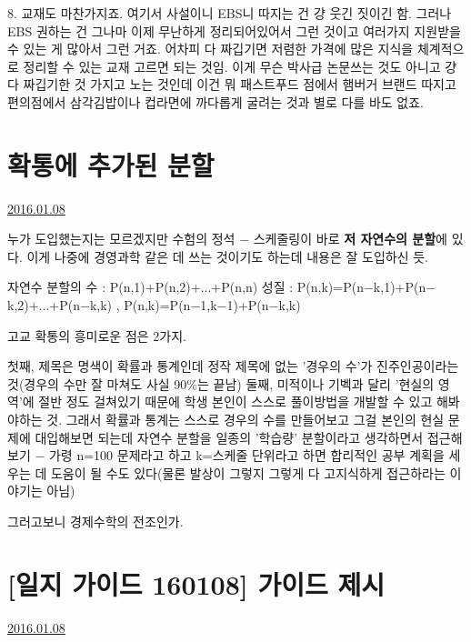 8. 교재도 마찬가지죠. 여기서 사설이니 EBS니 따지는 건 걍 웃긴 짓이긴 함.
그러나 EBS 권하는 건 그나마 이제 무난하게 정리되어있어서 그런 것이고 여러가지 지원받을 수 있는 게 많아서 그런 거죠.
어차피 다 짜깁기면 저렴한 가격에 많은 지식을 체계적으로 정리할 수 있는 교재 고르면 되는 것임.
이게 무슨 박사급 논문쓰는 것도 아니고 걍 다 짜깁기한 것 가지고 노는 것인데
이건 뭐 패스트푸드 점에서 햄버거 브랜드 따지고 편의점에서 삼각김밥이나 컵라면에 까다롭게 굴려는 것과 별로 다를 바도 없죠.






\section{확통에 추가된 분할}
\href{https://www.kockoc.com/Apoc/580053}{2016.01.08}

\vspace{5mm}

누가 도입했는지는 모르겠지만
수험의 정석 $-$ 스케줄링이 바로 \textbf{저 자연수의 분할}에 있다.
이게 나중에 경영과학 같은 데 쓰는 것이기도 하는데 내용은 잘 도입하신 듯.
\vspace{5mm}

자연수 분할의 수 : P(n,1)+P(n,2)+...+P(n,n)
성질 : P(n,k)=P(n$-$k,1)+P(n$-$k,2)+...+P(n$-$k,k) , P(n,k)=P(n$-$1,k$-$1)+P(n$-$k,k)
\vspace{5mm}

고교 확통의 흥미로운 점은 2가지.
\vspace{5mm}

첫째, 제목은 명색이 확률과 통계인데 정작 제목에 없는 '경우의 수'가 진주인공이라는 것(경우의 수만 잘 마쳐도 사실 90$\%$는 끝남)
둘째, 미적이나 기벡과 달리 '현실의 영역'에 절반 정도 걸쳐있기 때문에 학생 본인이 스스로 풀이방법을 개발할 수 있고 해봐야하는 것.
그래서 확률과 통계는 스스로 경우의 수를 만들어보고 그걸 본인의 현실 문제에 대입해보면 되는데
자연수 분할을 일종의 '학습량' 분할이라고 생각하면서 접근해보기 $-$ 가령 n=100 문제라고 하고 k=스케줄 단위라고 하면
합리적인 공부 계획을 세우는 데 도움이 될 수도 있다(물론 발상이 그렇지 그렇게 다 고지식하게 접근하라는 이야기는 아님)
\vspace{5mm}

그러고보니 경제수학의 전조인가.
\vspace{5mm}






\section{[일지 가이드 160108] 가이드 제시}
\href{https://www.kockoc.com/Apoc/580103}{2016.01.08}

